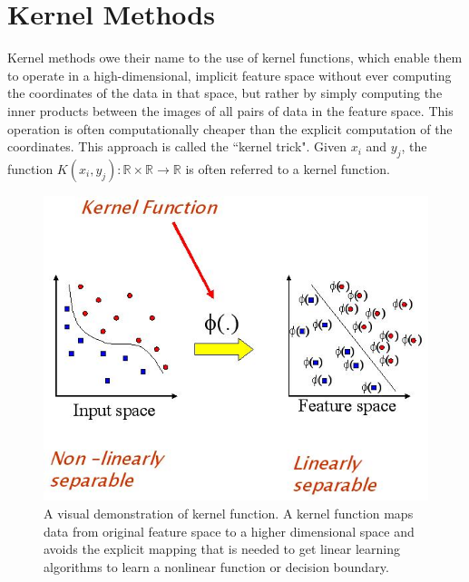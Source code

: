 \documentclass[12pt]{report} %
\begin{document}
\section{Kernel Methods}
Kernel methods owe their name to the use of kernel functions, which enable them to operate in a high-dimensional, implicit feature space without ever computing the coordinates of the data in that space, but rather by simply computing the inner products between the images of all pairs of data in the feature space. This operation is often computationally cheaper than the explicit computation of the coordinates. This approach is called the ``kernel trick"\cite{PR}. Given $x_{i}$ and $y_{j}$, the function $K(x_{i},y_{j}): \mathbb{R} \times \mathbb{R} \to \mathbb{R}$ is often referred to a kernel function.
\begin{figure}[H]
	\centering
	\includegraphics[scale=0.6]{pictures/kernel.jpg}
	\caption{A visual demonstration of kernel function. A kernel function maps data from original feature space to a higher dimensional space and avoids the explicit mapping that is needed to get linear learning algorithms to learn a nonlinear function or decision boundary\cite{KPIC}.}
	\label{fig:1}
\end{figure}
\end{document}
